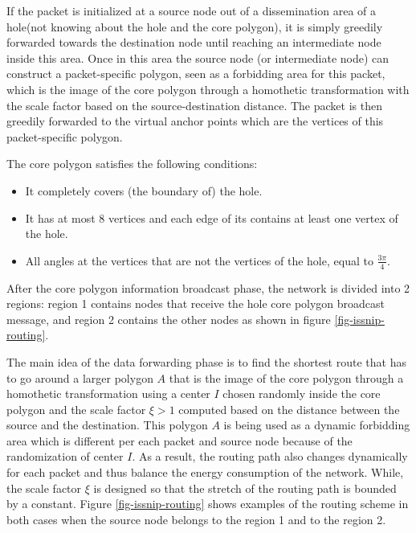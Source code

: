 If the packet is initialized at a source node out of a dissemination area of a hole(not knowing about the hole and the core polygon), it is simply greedily forwarded towards the destination node until reaching an intermediate node inside this area. Once in this area the source node (or intermediate node) can construct a packet-specific polygon, seen as a forbidding area for this packet, which is the image of the core polygon through a homothetic transformation with the scale factor based on the source-destination distance. The packet is then greedily forwarded to the virtual anchor points which are the vertices of this packet-specific polygon. 

The core polygon satisfies the following conditions:
\begin{itemize}
\item It completely covers (the boundary of) the hole.
\item It has at most 8 vertices and each edge of its contains at least one vertex of the hole.
\item All angles at the vertices that are not the vertices of the hole, equal to $\frac{3\pi}{4}$.
\end{itemize}

After the core polygon information broadcast phase, the network is divided into 2 regions: region 1 contains nodes that receive the hole core polygon broadcast message, and region 2 contains the other nodes as shown in figure \ref{fig-issnip-routing}.

The main idea of the data forwarding phase is to find the shortest route that has to go around a larger polygon $A$ that is the image of the core polygon through a homothetic transformation using a center $I$ chosen randomly inside the core polygon and the scale factor $\xi > 1$ computed based on the distance between the source and the destination. This polygon $A$ is being used as a dynamic forbidding area which is different per each packet and source node because of the randomization of center $I$. As a result, the routing path also changes dynamically for each packet and thus balance the energy consumption of the network. While, the scale factor $\xi$ is designed so that the stretch of the routing path is bounded by a constant. Figure \ref{fig-issnip-routing} shows examples of the routing scheme in both cases when the source node belongs to the region 1 and to the region 2.

